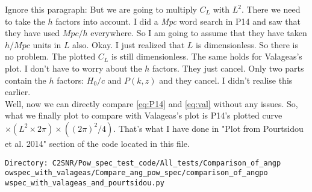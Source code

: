 \documentclass[12pt,a4paper]{article}
\begin{document}
Ignore this paragraph:  But we are going to multiply $ C_L $ with $ L^2 $. There we need to take the $ h $ factors into account.	I did a \textit{Mpc} word search in P14 and saw that they have used $ Mpc/h $ everywhere. So I am going to assume that they have taken $ h/Mpc $ units in $ L $ also.  Okay. I just realized that $ L $ is dimensionless. So there is no problem. The plotted $ C_L $ is still dimensionless. The same holds for Valageas's plot. I don't have to worry about the $ h $ factors. They just cancel. Only two parts contain the $ h $  factors: $ H_0/c $ and $ P(k,z) $ and they cancel. I didn't realise this earlier. 
\\

Well, now we can directly compare \eqref{eq:P14} and \eqref{eq:val} without any issues. So, what we finally plot to compare with Valageas's plot is P14's plotted curve $ \times (L^2 \times 2\pi)  \times \left( (2\pi)^2/4 \right) $. That's what I have done in "Plot from Pourtsidou et al. 2014" section of the code located in this file. 
\begin{verbatim}
Directory: C2SNR/Pow_spec_test_code/All_tests/Comparison_of_angp
owspec_with_valageas/Compare_ang_pow_spec/comparison_of_angpo
wspec_with_valageas_and_pourtsidou.py
\end{verbatim}
\end{document}
